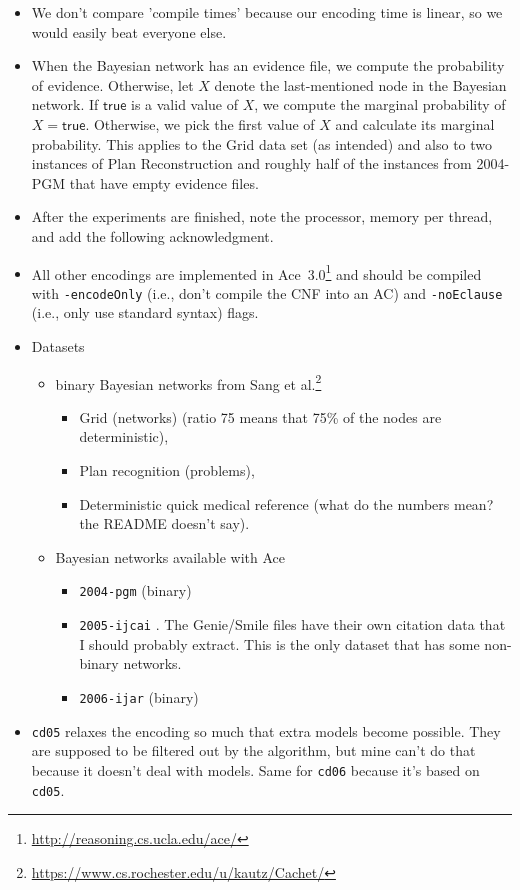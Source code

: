 \documentclass{article}
\theoremstyle{definition}
\theoremstyle{remark}
\begin{document}
\begin{itemize}
\item We don't compare 'compile times' because our encoding time is linear, so
  we would easily beat everyone else.
\item When the Bayesian network has an evidence file, we compute the probability
  of evidence. Otherwise, let $X$ denote the last-mentioned node in the Bayesian
  network. If $\mathsf{true}$ is a valid value of $X$, we compute the marginal
  probability of $X = \mathsf{true}$. Otherwise, we pick the first value of $X$
  and calculate its marginal probability. This applies to the Grid data set (as
  intended) and also to two instances of Plan Reconstruction and roughly half of
  the instances from 2004-PGM that have empty evidence files.
\item After the experiments are finished, note the processor, memory per thread,
  and add the following acknowledgment.
\item All other encodings are implemented in
  Ace~3.0\footnote{\url{http://reasoning.cs.ucla.edu/ace/}} and should be
  compiled with \texttt{-encodeOnly} (i.e., don't compile the CNF into an AC)
  and \texttt{-noEclause} (i.e., only use standard syntax) flags.
\item Datasets
  \begin{itemize}
  \item binary Bayesian networks from Sang et
    al.\footnote{\url{https://www.cs.rochester.edu/u/kautz/Cachet/}}
    \cite{DBLP:conf/aaai/SangBK05}
    \begin{itemize}
    \item Grid (networks) (ratio 75 means that 75\% of the nodes are
      deterministic),
    \item Plan recognition (problems),
    \item Deterministic quick medical reference (what do the numbers mean? the
      README doesn't say).
    \end{itemize}
  \item Bayesian networks available with Ace
    \begin{itemize}
    \item \texttt{2004-pgm} \cite{DBLP:journals/ijar/ChaviraDJ06} (binary)
    \item \texttt{2005-ijcai} \cite{DBLP:conf/ijcai/ChaviraD05}. The Genie/Smile
      files have their own citation data that I should probably extract. This is
      the only dataset that has some non-binary networks.
    \item \texttt{2006-ijar} \cite{DBLP:journals/ijar/ChaviraDJ06} (binary)
    \end{itemize}
  \end{itemize}
\item \texttt{cd05} relaxes the encoding so much that extra models become
  possible. They are supposed to be filtered out by the algorithm, but mine
  can't do that because it doesn't deal with models. Same for \texttt{cd06}
  because it's based on \texttt{cd05}.
\end{itemize}
\end{document}
